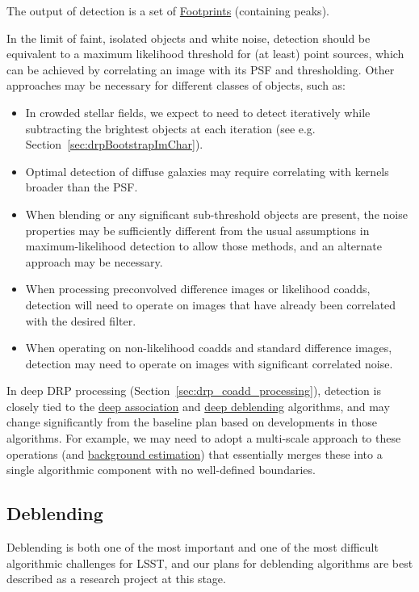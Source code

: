 The output of detection is a set of \hyperref[sec:spFootprints]{Footprints} (containing peaks).

In the limit of faint, isolated objects and white noise, detection should be equivalent to a maximum likelihood threshold for (at least) point sources, which can be achieved by correlating an image with its PSF and thresholding.  Other approaches may be necessary for different classes of objects, such as:
\begin{itemize}
  \item In crowded stellar fields, we expect to need to detect iteratively while subtracting the brightest objects at each iteration (see e.g. Section~\ref{sec:drpBootstrapImChar}).
  \item Optimal detection of diffuse galaxies may require correlating with kernels broader than the PSF.
  \item When blending or any significant sub-threshold objects are present, the noise properties may be sufficiently different from the usual assumptions in maximum-likelihood detection to allow those methods, and an alternate approach may be necessary.
  \item When processing preconvolved difference images or likelihood coadds, detection will need to operate on images that have already been correlated with the desired filter.
  \item When operating on non-likelihood coadds and standard difference images, detection may need to operate on images with significant correlated noise.
\end{itemize}

In deep DRP processing (Section~\ref{sec:drp_coadd_processing}), detection is closely tied to the \hyperref[drpDeepAssociate]{deep association} and \hyperref[drpDeepDeblend]{deep deblending} algorithms, and may change significantly from the baseline plan based on developments in those algorithms.  For example, we may need to adopt a multi-scale approach to these operations (and \hyperref[sec:drpCoaddBackgroundEstimation]{background estimation}) that essentially merges these into a single algorithmic component with no well-defined boundaries.


\subsection{Deblending}
\label{sec:acDeblending}

Deblending is both one of the most important and one of the most difficult algorithmic challenges for LSST, and our plans for deblending algorithms are best described as a research project at this stage.

